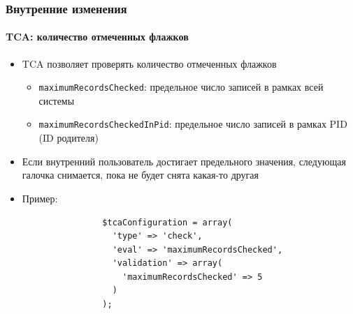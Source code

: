 \begin{frame}[fragile]
	\frametitle{Внутренние изменения}
	\framesubtitle{TCA: количество отмеченных флажков}

	\lstset{
		basicstyle=\tiny\ttfamily
	}

	\begin{itemize}
		\item TCA позволяет проверять количество отмеченных флажков

			\begin{itemize}
				\item \texttt{maximumRecordsChecked}:\newline
					предельное число записей в рамках всей системы
				\item \texttt{maximumRecordsCheckedInPid}:\newline
					предельное число записей в рамках PID (ID родителя)
			\end{itemize}

		\item Если внутренний пользователь достигает предельного значения, следующая галочка снимается,
		пока не будет снята какая-то другая

		\item Пример:

			\begin{lstlisting}
				$tcaConfiguration = array(
				  'type' => 'check',
				  'eval' => 'maximumRecordsChecked',
				  'validation' => array(
				    'maximumRecordsChecked' => 5
				  )
				);
			\end{lstlisting}

	\end{itemize}

\end{frame}


